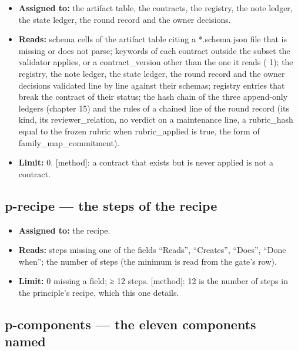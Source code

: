 \documentclass[
  american,
  10pt,
]{report}
\providecommand{\tightlist}{%
  \setlength{\itemsep}{0pt}\setlength{\parskip}{0pt}}
\renewcommand{\texttt}[1]{{\ttfamily\hyphenchar\font=-1 #1}}
\begin{document}
\begin{itemize}
\tightlist
\item
  \textbf{Assigned to:} the artifact table, the contracts, the registry,
  the note ledger, the state ledger, the round record and the owner
  decisions.
\item
  \textbf{Reads:} schema cells of the artifact table citing a
  \texttt{*.\allowbreak{}schema.\allowbreak{}json} file that is missing
  or does not parse; keywords of each contract outside the subset the
  validator applies, or a \texttt{contract\_\allowbreak{}version} other
  than the one it reads (\texttt{1}); the registry, the note ledger, the
  state ledger, the round record and the owner decisions validated line
  by line against their schemas; registry entries that break the
  contract of their status; the hash chain of the three append-only
  ledgers (chapter 15) and the rules of a chained line of the round
  record (its \texttt{kind}, its
  \texttt{reviewer\_\allowbreak{}relation}, no verdict on a maintenance
  line, a \texttt{rubric\_\allowbreak{}hash} equal to the frozen rubric
  when \texttt{rubric\_\allowbreak{}applied} is true, the form of
  \texttt{family\_\allowbreak{}map\_\allowbreak{}commitment}).
\item
  \textbf{Limit:} 0. \texttt{[method]}: a contract that exists but is
  never applied is not a contract.
\end{itemize}

\subsection{\texorpdfstring{\texttt{p-\allowbreak{}recipe} --- the steps
of the
recipe}{ --- the steps of the recipe}}\label{p-recipe-the-steps-of-the-recipe}

\begin{itemize}
\tightlist
\item
  \textbf{Assigned to:} the recipe.
\item
  \textbf{Reads:} steps missing one of the fields ``Reads'',
  ``Creates'', ``Does'', ``Done when''; the number of steps (the minimum
  is read from the gate's row).
\item
  \textbf{Limit:} 0 missing a field; ≥ 12 steps. \texttt{[method]}: 12
  is the number of steps in the principle's recipe, which this one
  details.
\end{itemize}

\subsection{\texorpdfstring{\texttt{p-\allowbreak{}components} --- the
eleven components
named}{ --- the eleven components named}}\label{p-components-the-eleven-components-named}
\end{document}
